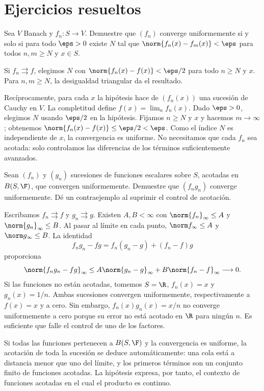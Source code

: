 \section{Ejercicios resueltos}
\begin{ejercicio}\label{ch26:ej1}
Sea $V$ Banach y $f_n:S\to V$. Demuestre que $(f_n)$ converge uniformemente si y solo si para todo $\eps>0$ existe $N$ tal que $\norm{f_n(x)-f_m(x)}<\eps$ para todos $n,m\ge N$ y $x\in S$.
\end{ejercicio}
\begin{solucion}
Si $f_n\rightrightarrows f$, elegimos $N$ con $\norm{f_n(x)-f(x)}<\eps/2$ para todo $n\ge N$ y $x$. Para $n,m\ge N$, la desigualdad triangular da el resultado.

Recíprocamente, para cada $x$ la hipótesis hace de $(f_n(x))$ una sucesión de Cauchy en $V$. La completitud define $f(x)=\lim_nf_n(x)$. Dado $\eps>0$, elegimos $N$ usando $\eps/2$ en la hipótesis. Fijamos $n\ge N$ y $x$ y hacemos $m\to\infty$; obtenemos $\norm{f_n(x)-f(x)}\le\eps/2<\eps$. Como el índice $N$ es independiente de $x$, la convergencia es uniforme. No necesitamos que cada $f_n$ sea acotada: solo controlamos las diferencias de los términos suficientemente avanzados.
\end{solucion}

\begin{ejercicio}
Sean $(f_n)$ y $(g_n)$ sucesiones de funciones escalares sobre $S$, acotadas en $B(S,\F)$, que convergen uniformemente. Demuestre que $(f_ng_n)$ converge uniformemente. Dé un contraejemplo al suprimir el control de acotación.
\end{ejercicio}
\begin{solucion}
Escribamos $f_n\rightrightarrows f$ y $g_n\rightrightarrows g$. Existen $A,B<\infty$ con $\norm{f_n}_\infty\le A$ y $\norm{g_n}_\infty\le B$. Al pasar al límite en cada punto, $\norm f_\infty\le A$ y $\norm g_\infty\le B$. La identidad
\[
 f_ng_n-fg=f_n(g_n-g)+(f_n-f)g
\]
proporciona
\[
 \norm{f_ng_n-fg}_\infty
 \le A\norm{g_n-g}_\infty+B\norm{f_n-f}_\infty\longrightarrow0.
\]
Si las funciones no están acotadas, tomemos $S=\R$, $f_n(x)=x$ y $g_n(x)=1/n$. Ambas sucesiones convergen uniformemente, respectivamente a $f(x)=x$ y a cero. Sin embargo, $f_n(x)g_n(x)=x/n$ no converge uniformemente a cero porque su error no está acotado en $\R$ para ningún $n$. Es suficiente que falle el control de uno de los factores.

Si todas las funciones pertenecen a $B(S,\F)$ y la convergencia es uniforme, la acotación de toda la sucesión se deduce automáticamente: una cola está a distancia menor que uno del límite, y los primeros términos son un conjunto finito de funciones acotadas. La hipótesis expresa, por tanto, el contexto de funciones acotadas en el cual el producto es continuo.
\end{solucion}

